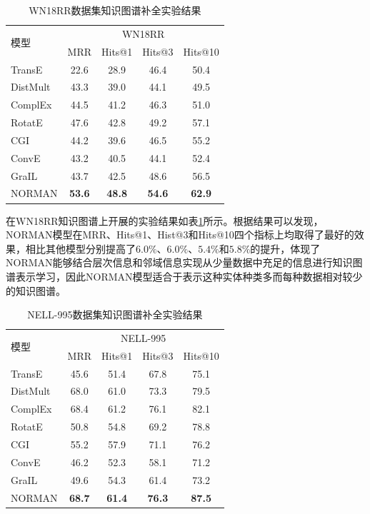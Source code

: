 \documentclass[algorithmlist, AutoFakeBold, AutoFakeSlant, figurelist, tablelist, nomlist, engineering]{seuthesix}
\begin{document}
\begin{table}[t]
  \centering
  \caption{WN18RR数据集知识图谱补全实验结果}
  \begin{tabular*}{0.95\textwidth}{@{\extracolsep{\fill}}lcccc}
    \toprule[1pt]
    \multirow{2}{*}{模型} & \multicolumn{4}{c}{WN18RR} \\
      & MRR & Hits@1 & Hits@3 & Hits@10 \\ \hline
    TransE & 22.6 & 28.9 & 46.4 & 50.4 \\
    DistMult & 43.3 & 39.0 & 44.1 & 49.5 \\
    ComplEx & 44.5 & 41.2 & 46.3 & 51.0 \\
    RotatE & 47.6 & 42.8 & 49.2 & 57.1 \\
    CGI & 44.2 & 39.6 & 46.5 & 55.2 \\
    ConvE & 43.2 & 40.5 & 44.1 & 52.4 \\
    GraIL & 43.7 & 42.5 & 48.6 & 56.5 \\
    NORMAN & \textbf{53.6} & \textbf{48.8} & \textbf{54.6} & \textbf{62.9} \\
    \bottomrule[1pt]
  \end{tabular*}
  \label{Experiment1_WN18RR}
\end{table}

在WN18RR知识图谱上开展的实验结果如表\ref{Experiment1_WN18RR}所示。根据结果可以发现，NORMAN模型在MRR、Hits@1、Hist@3和Hits@10四个指标上均取得了最好的效果，相比其他模型分别提高了$6.0\%$、$6.0\%$、$5.4\%$和$5.8\%$的提升，体现了NORMAN能够结合层次信息和邻域信息实现从少量数据中充足的信息进行知识图谱表示学习，因此NORMAN模型适合于表示这种实体种类多而每种数据相对较少的知识图谱。

\begin{table}[t]
  \centering
  \caption{NELL-995数据集知识图谱补全实验结果}
  \begin{tabular*}{0.95\textwidth}{@{\extracolsep{\fill}}lcccc}
    \toprule[1pt]
    \multirow{2}{*}{模型} & \multicolumn{4}{c}{NELL-995} \\
      & MRR & Hits@1 & Hits@3 & Hits@10 \\ \hline
    TransE & 45.6 & 51.4 & 67.8 & 75.1 \\
    DistMult & 68.0 & 61.0 & 73.3 & 79.5 \\
    ComplEx & 68.4 & 61.2 & 76.1 & 82.1 \\
    RotatE & 50.8 & 54.8 & 69.2 & 78.8 \\
    CGI & 55.2 & 57.9 & 71.1 & 76.2 \\
    ConvE & 46.2 & 52.3 & 58.1 & 71.2 \\
    GraIL & 49.6 & 54.3 & 61.4 & 73.2 \\
    NORMAN & \textbf{68.7} & \textbf{61.4} & \textbf{76.3} & \textbf{87.5} \\
    \bottomrule[1pt]
  \end{tabular*}
  \label{Experiment1_NELL-995}
\end{table}
\end{document}
